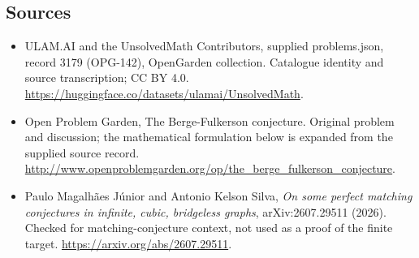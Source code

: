 \documentclass[11pt,a4paper]{article}
\begin{document}
\subsection{Sources}
\begin{itemize}
\item[S1] ULAM.AI and the UnsolvedMath Contributors, supplied problems.json, record 3179 (OPG-142), OpenGarden collection. Catalogue identity and source transcription; CC BY 4.0.
\url{https://huggingface.co/datasets/ulamai/UnsolvedMath}.
\item[S2] Open Problem Garden, The Berge-Fulkerson conjecture. Original problem and discussion; the mathematical formulation below is expanded from the supplied source record.
\url{http://www.openproblemgarden.org/op/the_berge_fulkerson_conjecture}.
\item[S3] Paulo Magalh\~aes J\'unior and Antonio Kelson Silva, \emph{On some perfect matching conjectures in infinite, cubic, bridgeless graphs}, arXiv:2607.29511 (2026). Checked for matching-conjecture context, not used as a proof of the finite target.
\url{https://arxiv.org/abs/2607.29511}.
\end{itemize}
\end{document}
